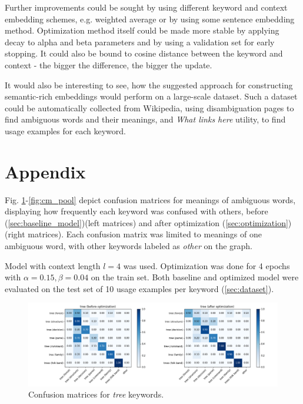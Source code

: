 \documentclass{llncs}
\begin{document}
Further improvements could be sought by using different keyword and context embedding schemes, e.g. weighted average or by using some sentence embedding method. Optimization method itself could be made more stable by applying decay to alpha and beta parameters and by using a validation set for early stopping. It could also be bound to cosine distance between the keyword and context - the bigger the difference, the bigger the update.

It would also be interesting to see, how the suggested approach for constructing semantic-rich embeddings would perform on a large-scale dataset.
Such a dataset could be automatically collected from Wikipedia, using disambiguation pages to find ambiguous words and their meanings, and \textit{What links here} utility, to find usage examples for each keyword.




\newpage
\appendix
\section{Appendix}
\label{sec:appendix}

Fig. \ref{fig:cm_tree}-\ref{fig:cm_pool} depict confusion matrices for meanings of ambiguous words, displaying how frequently each keyword was confused with others, before (\ref{sec:baseline_model})(left matrices) and after optimization (\ref{sec:optimization})(right matrices).
Each confusion matrix was limited to meanings of one ambiguous word, with other keywords labeled as \textit{other} on the graph.

Model with context length \(l=4\) was used.  Optimization was done for 4 epochs with \(\alpha=0.15, \beta=0.04\) on the train set. Both baseline and optimized model were evaluated on the test set of 10 usage examples per keyword (\ref{sec:dataset}).

\begin{figure}
    \centering
    \caption{Confusion matrices for \textit{tree} keywords.}
    \label{fig:cm_tree}
    \includegraphics[scale=0.38]{res/cm_tree.png}
\end{figure}
\end{document}
